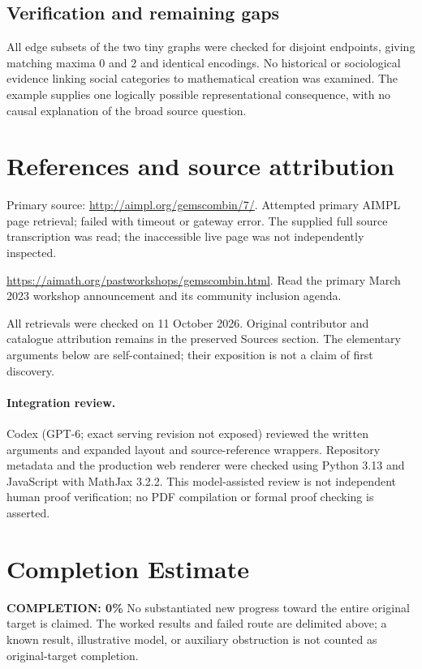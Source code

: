 \documentclass[11pt]{article}
\begin{document}
\subsection{Verification and remaining gaps}
All edge subsets of the two tiny graphs were checked for disjoint endpoints, giving matching maxima 0 and 2 and identical encodings. No historical or sociological evidence linking social categories to mathematical creation was examined. The example supplies one logically possible representational consequence, with no causal explanation of the broad source question.

\section{References and source attribution}
Primary source: \url{http://aimpl.org/gemscombin/7/}. Attempted primary AIMPL page retrieval; failed with timeout or gateway error. The supplied full source transcription was read; the inaccessible live page was not independently inspected.

\url{https://aimath.org/pastworkshops/gemscombin.html}. Read the primary March 2023 workshop announcement and its community inclusion agenda.

All retrievals were checked on 11 October 2026. Original contributor and catalogue attribution remains in the preserved Sources section. The elementary arguments below are self-contained; their exposition is not a claim of first discovery.


\paragraph{Integration review.} Codex (GPT-6; exact serving revision not exposed) reviewed the written arguments and expanded layout and source-reference wrappers. Repository metadata and the production web renderer were checked using Python 3.13 and JavaScript with MathJax 3.2.2. This model-assisted review is not independent human proof verification; no PDF compilation or formal proof checking is asserted.

\section{Completion Estimate}
\noindent\textbf{COMPLETION: 0\%}
No substantiated new progress toward the entire original target is claimed. The worked results and failed route are delimited above; a known result, illustrative model, or auxiliary obstruction is not counted as original-target completion.
\end{document}
